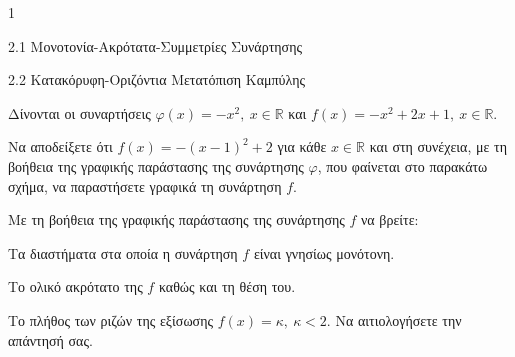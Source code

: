 \begin{ylh}{1}
\item 2.1 Μονοτονία-Ακρότατα-Συμμετρίες Συνάρτησης
\item 2.2 Κατακόρυφη-Οριζόντια Μετατόπιση Καμπύλης
\end{ylh}
Δίνονται οι συναρτήσεις $\varphi(x) = - x^{2},\ x\mathbb{\in R}$ και $f(x) = - x^{2} + 2x + 1,\ x\mathbb{\in R.}$
\begin{alist}
\item Να αποδείξετε ότι $f(x) = - (x - 1)^{2} + 2$ για κάθε $x\mathbb{\in R}$ και στη συνέχεια, με τη βοήθεια της γραφικής παράστασης της συνάρτησης $\varphi$, που φαίνεται στο παρακάτω σχήμα, να παραστήσετε γραφικά τη συνάρτηση $f.$
\begin{center}
\end{center}
\item Με τη βοήθεια της γραφικής παράστασης της συνάρτησης $f$ να βρείτε:
\end{alist}
\begin{alist}
\item
  Τα διαστήματα στα οποία η συνάρτηση $f$ είναι γνησίως μονότονη.
\end{alist}
\begin{alist}
\item
  Το ολικό ακρότατο της $f$ καθώς και τη θέση του.
\end{alist}
\begin{alist}
\item
  Το πλήθος των ριζών της εξίσωσης $f(x) = \kappa,\ \kappa < 2.$ Να αιτιολογήσετε την απάντησή σας.
\end{alist}

